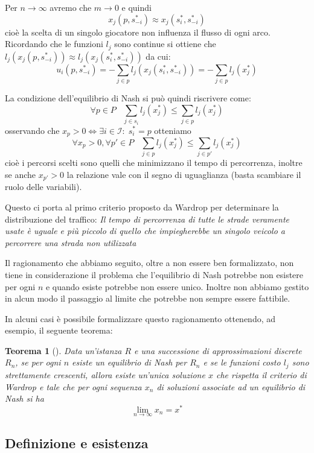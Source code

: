 \documentclass[a4paper]{article}
\newcounter{counter1}
\theoremstyle{plain}
\newtheorem{myteo}[counter1]{Teorema}
\theoremstyle{definition}
\theoremstyle{remark}
\newcommand{\pa}[1]{\left(#1\right)}
\begin{document}
Per $n \to \infty$ avremo che $m\to 0$ e quindi
\[ x_j\pa{p, s^*_{-i}} \approx x_j\pa{s^*_i, s^*_{-i}} \]
cioè la scelta di un singolo giocatore non influenza il flusso di ogni
arco. Ricordando che le funzioni $l_j$ sono continue si ottiene che
$l_j\pa{x_j\pa{p, s^*_{-i}}} \approx l_j\pa{x_j\pa{s^*_i, s^*_{-i}}}$ da cui:
\[ u_i\pa{p, s^*_{-i}} = - \sum_{j\in p} l_j\pa{x_j\pa{s^*_i,
      s^*_{-i}}} = -\sum _{j\in p}l_j\pa{x^*_j} \]

La condizione dell'equilibrio di Nash si può quindi riscrivere come:
\[ \forall p\in P\;\;\; \sum _{j\in s_i}l_j\pa{x^*_j} \le \sum _{j\in
    p}l_j\pa{x^*_j} \]
osservando che $x_p > 0 \Leftrightarrow \exists i\in \mathcal{I}:\;
s^*_i = p$ otteniamo
\[ \forall x_p >0, \forall p'\in P \;\;\; \sum _{j\in p}l_j\pa{x^*_j}
  \le \sum _{j\in p'}l_j\pa{x^*_j} \]
cioè i percorsi scelti sono quelli che minimizzano il tempo di
percorrenza, inoltre se anche $x_{p'} > 0$ la relazione vale con il
segno di uguaglianza (basta scambiare il ruolo delle variabili).

Questo ci porta al primo criterio proposto da
Wardrop\cite[pag. 345]{wardrop1952} per determinare la distribuzione
del traffico: \textit{Il tempo di percorrenza di tutte le strade
  veramente usate è uguale e più piccolo di quello che impiegherebbe
  un singolo veicolo a percorrere una strada non utilizzata}

Il ragionamento che abbiamo seguito, oltre a non essere ben
formalizzato, non tiene in considerazione il problema che l'equilibrio
di Nash potrebbe non esistere per ogni $n$ e quando esiste potrebbe
non essere unico. Inoltre non abbiamo gestito in alcun modo il
passaggio al limite che potrebbe non sempre essere fattibile.

In alcuni casi è possibile formalizzare questo ragionamento ottenendo,
ad esempio, il seguente teorema:
\begin{myteo}[{\cite[Teorema 3.2]{haurie1985}}]
  Data un'istanza $R$ e una successione di approssimazioni discrete
  $R_n$, se per ogni $n$ esiste un equilibrio di Nash per $R_n$ e se
  le funzioni costo $l_j$ sono strettamente crescenti, allora esiste
  un'unica soluzione $x$ che rispetta il criterio di Wardrop e tale
  che per ogni sequenza $x_n$ di soluzioni associate ad un equilibrio
  di Nash si ha
  \[ \lim _{n\to \infty} x_n = x^* \]
\end{myteo}

\subsection{Definizione e esistenza}
\end{document}
